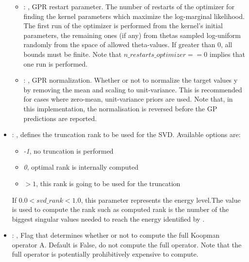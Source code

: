 \begin{itemize}
\begin{itemize}
        \item {}: ,
          GPR restart parameter. The number of restarts of the optimizer for finding the
          kernel parameters which maximize the log-marginal likelihood. The first run of the
          optimizer                                                  is performed from the kernel’s
          initial parameters, the remaining ones (if any) from thetas
          sampled log-uniform randomly from the space of allowed theta-values. If greater than 0,
          all bounds must be finite. Note that $n\_restarts\_optimizer == 0$ implies that one run is
          performed.

        \item {}: ,
          GPR normalization. Whether or not to normalize the target values y by removing the mean
          and scaling                                                  to unit-variance. This is
          recommended for cases where zero-mean, unit-variance priors are used.
          Note that, in this implementation, the normalisation is reversed before the GP predictions
          are reported.
      \end{itemize}

    \item {}: ,
      defines the truncation rank to be used for the SVD.
      Available options are:                                                  \begin{itemize}
      \item \textit{-1}, no truncation is performed
      \item \textit{0}, optimal rank is internally computed
      \item \textit{$>1$}, this rank is going to be used for the truncation
      \end{itemize}                                                  If $0.0 < svd\_rank < 1.0$, this
      parameter represents the energy level.The value is used to compute the rank such
      as computed rank is the number of the biggest singular values needed to reach the energy
      identified by                                                    .

    \item {}: ,
      Flag that determines whether or not to compute the full Koopman operator A.
      Default is False, do not compute the full operator. Note that the full operator
      is potentially prohibitively expensive to compute.


\end{itemize}
